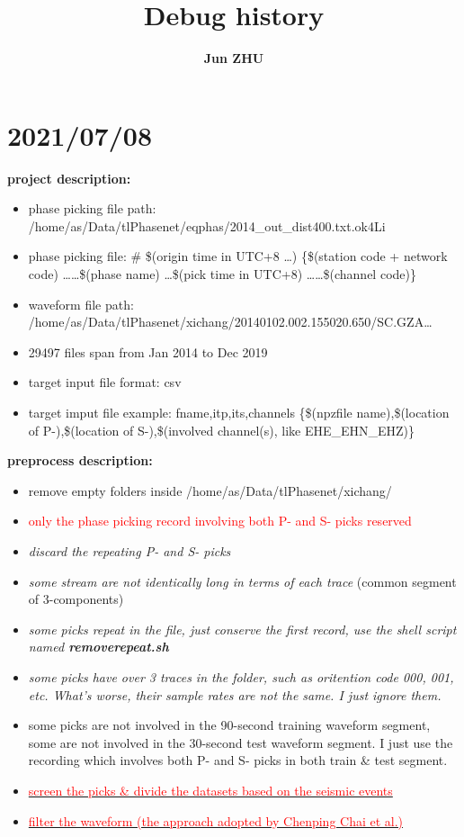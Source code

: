 \documentclass{article}
\title{\textbf{Debug history}}
\author{\textbf{Jun ZHU}}
\begin{document}
\maketitle
\section{2021/07/08}
\par{\textbf{project description:}}
\begin{itemize}
  \item phase picking file path: /home/as/Data/tlPhasenet/eqphas/2014\_out\_dist400.txt.ok4Li
  \item phase picking file: \# \$(origin time in UTC+8 \ldots) \{\$(station code + network code) \ldots \ldots \$(phase name)   \ldots \$(pick time in UTC+8) \ldots \ldots \$(channel code)\}
  \item waveform file path: /home/as/Data/tlPhasenet/xichang/20140102.002.155020.650/SC.GZA\ldots
  \item 29497 files span from Jan 2014 to Dec 2019
  \item target input file format: csv
  \item target imput file example: fname,itp,its,channels \{\$(npzfile name),\$(location of P-),\$(location of S-),\$(involved channel(s), like EHE\_EHN\_EHZ)\}
\end{itemize}

\par{\textbf{preprocess description:}}
\begin{itemize}
  \item remove empty folders inside /home/as/Data/tlPhasenet/xichang/
  \item \textcolor{red}{only the phase picking record involving both P- and S- picks reserved}
  \item \textit {discard the repeating P- and S- picks}
  \item \textit {some stream are not identically long in terms of each trace} (common segment of 3-components)
  \item \textit {some picks repeat in the file, just conserve the first record, use the shell script named \textbf{removerepeat.sh}}
  \item \textit {some picks have over 3 traces in the folder, such as oritention code 000, 001, etc. What's worse, their sample rates are not the same. I just ignore them.}
  \item {some picks are not involved in the 90-second training waveform segment, some are not involved in the 30-second test waveform segment. I just use the recording which involves both P- and S- picks in both train \& test segment.}
  \item \underline {\textcolor{red}{screen the picks \& divide the datasets based on the seismic events}}
  \item \underline {\textcolor{red}{filter the waveform (the approach adopted by Chenping Chai et al.)}}
\end{itemize}
\end{document}
